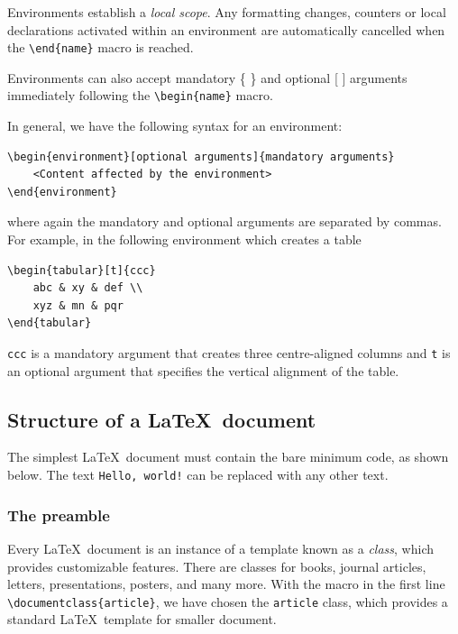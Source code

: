 			Environments establish a \emph{local scope}. Any formatting changes, counters or local declarations activated within an environment are automatically cancelled when the \lstinline|\end{name}| macro is reached.
			
			Environments can also accept mandatory \{ \} and optional [ ] arguments immediately following the \lstinline|\begin{name}| macro.
				
			In general, we have the following syntax for an environment:
\begin{lstlisting}
\begin{environment}[optional arguments]{mandatory arguments}
	<Content affected by the environment>
\end{environment}
\end{lstlisting}
			where again the mandatory and optional arguments are separated by commas. For example, in the following environment which creates a table
\begin{lstlisting}
\begin{tabular}[t]{ccc}
	abc & xy & def \\
	xyz & mn & pqr
\end{tabular}
\end{lstlisting}
			\verb|ccc| is a mandatory argument that creates three centre-aligned columns and \verb|t| is an optional argument that specifies the vertical alignment of the table.

	\subsection{Structure of a \LaTeX\ document}
		The simplest \LaTeX\ document must contain the bare minimum code, as shown below. The text \verb|Hello, world!| can be replaced with any other text.


		\subsubsection{The preamble}
			Every \LaTeX\ document is an instance of a template known as a \emph{class}, which provides customizable features. There are classes for books, journal articles, letters, presentations, posters, and many more. With the macro in the first line \lstinline|\documentclass{article}|, we have chosen the \verb|article| class, which provides a standard \LaTeX\ template for smaller document.
			
